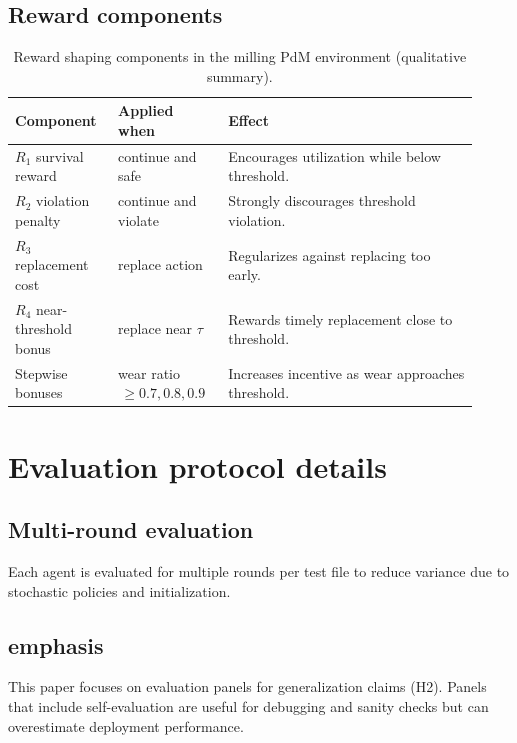 \documentclass[sn-basic]{sn-jnl} %
\begin{document}
\begin{appendices}
\subsection{Reward components}
\begin{table}[t]
		\centering
		\caption{Reward shaping components in the milling PdM environment (qualitative summary).}
		\label{tab:reward_components}
		\begin{tabular}{p{0.20\linewidth} p{0.22\linewidth} p{0.50\linewidth}}
				\toprule
				\textbf{Component} & \textbf{Applied when} & \textbf{Effect}\\
				\midrule
				$R_1$ survival reward & continue and safe & Encourages utilization while below threshold.\\
				$R_2$ violation penalty & continue and violate & Strongly discourages threshold violation.\\
				$R_3$ replacement cost & replace action & Regularizes against replacing too early.\\
				$R_4$ near-threshold bonus & replace near $\tau$ & Rewards timely replacement close to threshold.\\
				Stepwise bonuses & wear ratio $\,\ge 0.7, 0.8, 0.9$ & Increases incentive as wear approaches threshold.\\
				\bottomrule
		\end{tabular}
\end{table}

\section{Evaluation protocol details}
\label{app:eval}
\subsection{Multi-round evaluation}
Each agent is evaluated for multiple rounds per test file to reduce variance due to stochastic policies and initialization.

\subsection{ emphasis}
This paper focuses on  evaluation panels for generalization claims (H2). Panels that include self-evaluation are useful for debugging and sanity checks but can overestimate deployment performance.


\end{appendices}
\end{document}
